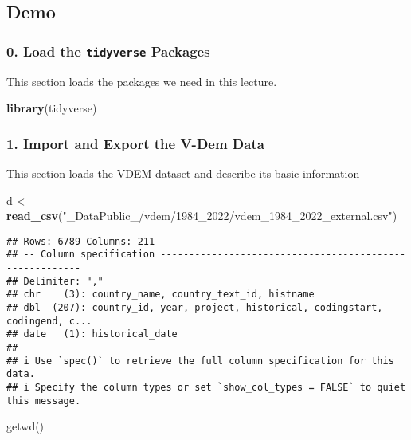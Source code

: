 \documentclass[
]{article}
\newenvironment{Shaded}{\begin{snugshade}}{\end{snugshade}}
\newcommand{\FunctionTok}[1]{\textcolor[rgb]{0.13,0.29,0.53}{\textbf{#1}}}
\newcommand{\NormalTok}[1]{#1}
\newcommand{\OtherTok}[1]{\textcolor[rgb]{0.56,0.35,0.01}{#1}}
\newcommand{\StringTok}[1]{\textcolor[rgb]{0.31,0.60,0.02}{#1}}
\begin{document}
\hypertarget{demo}{%
\subsection{Demo}\label{demo}}

\hypertarget{load-the-tidyverse-packages}{%
\subsubsection{\texorpdfstring{0. Load the \texttt{tidyverse}
Packages}{0. Load the tidyverse Packages}}\label{load-the-tidyverse-packages}}

This section loads the packages we need in this lecture.

\begin{Shaded}
\begin{Highlighting}[]
\FunctionTok{library}\NormalTok{(tidyverse)}
\end{Highlighting}
\end{Shaded}

\hypertarget{import-and-export-the-v-dem-data}{%
\subsubsection{1. Import and Export the V-Dem
Data}\label{import-and-export-the-v-dem-data}}

This section loads the VDEM dataset and describe its basic information

\begin{Shaded}
\begin{Highlighting}[]
\NormalTok{d }\OtherTok{\textless{}{-}} \FunctionTok{read\_csv}\NormalTok{(}\StringTok{"\_DataPublic\_/vdem/1984\_2022/vdem\_1984\_2022\_external.csv"}\NormalTok{)}
\end{Highlighting}
\end{Shaded}

\begin{verbatim}
## Rows: 6789 Columns: 211
## -- Column specification --------------------------------------------------------
## Delimiter: ","
## chr    (3): country_name, country_text_id, histname
## dbl  (207): country_id, year, project, historical, codingstart, codingend, c...
## date   (1): historical_date
## 
## i Use `spec()` to retrieve the full column specification for this data.
## i Specify the column types or set `show_col_types = FALSE` to quiet this message.
\end{verbatim}

getwd()
\end{document}
